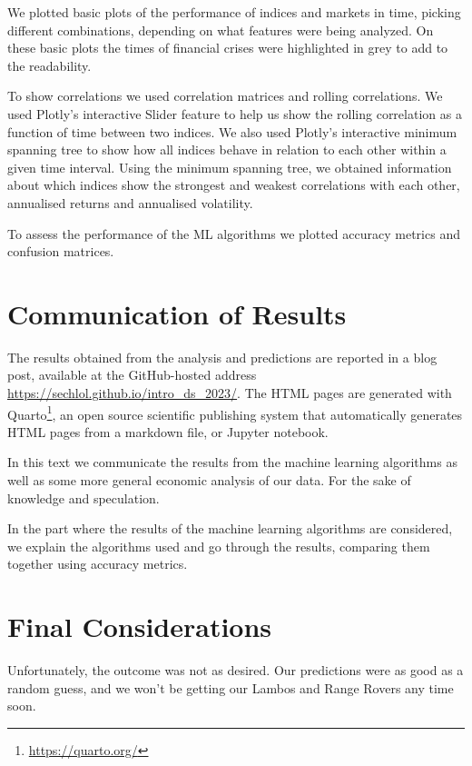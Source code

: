 \documentclass[10pt]{article} %
\begin{document}
We plotted basic plots of the performance of indices and markets in time, picking different combinations, depending on what features were being analyzed. On these basic plots the times of financial crises were highlighted in grey to add to the readability.

To show correlations we used correlation matrices and rolling correlations.
We used Plotly's interactive Slider feature to help us show the rolling correlation as a function of time between two indices. We also used Plotly's interactive minimum spanning tree to show how all indices behave in relation to each other within a given time interval. Using the minimum spanning tree, we obtained information about which indices show the strongest and weakest correlations with each other, annualised returns and annualised volatility.

To assess the performance of the ML algorithms we plotted accuracy metrics and confusion matrices. 


\section{Communication of Results}

The results obtained from the analysis and predictions are reported in a blog post, available at the GitHub-hosted address \href{https://sechlol.github.io/intro\_ds\_2023/}{https://sechlol.github.io/intro\_ds\_2023/}. The HTML pages are generated with Quarto\footnote{\href{https://quarto.org/}{https://quarto.org/}}, an open source scientific publishing system that automatically generates HTML pages from a markdown file, or Jupyter notebook.

In this text we communicate the results from the machine learning algorithms as well as some more general economic analysis of our data. For the sake of knowledge and speculation.

In the part where the results of the machine learning algorithms are considered, we explain the algorithms used and go through the results, comparing them together using accuracy metrics. 

\section{Final Considerations}

Unfortunately, the outcome was not as desired. Our predictions were as good as a random guess, and we won't be getting our Lambos and Range Rovers any time soon. 
\end{document}
